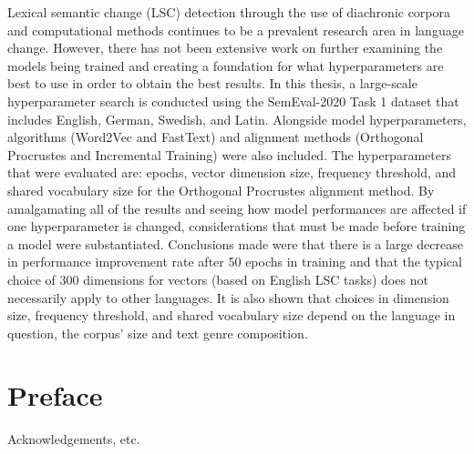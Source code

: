 \documentclass[11pt, a4paper]{article}
\begin{document}
Lexical semantic change (LSC) detection through the use of diachronic corpora and computational methods continues to be a prevalent research area in language change. However, there has not been extensive work on further examining the models being trained and creating a foundation for what hyperparameters are best to use in order to obtain the best results.  In this thesis,  a large-scale hyperparameter search is conducted using the SemEval-2020 Task 1 dataset that includes English, German, Swedish, and Latin. Alongside model hyperparameters, algorithms (Word2Vec and FastText) and alignment methods (Orthogonal Procrustes and Incremental Training) were also included. The hyperparameters that were evaluated are: epochs, vector dimension size, frequency threshold, and shared vocabulary size for the Orthogonal Procrustes alignment method. By amalgamating all of the results and seeing how model performances are affected if one hyperparameter is changed, considerations that must be made before training a model were substantiated. Conclusions made were that there is a large decrease in performance improvement rate after 50 epochs in training and that the typical choice of 300 dimensions for vectors (based on English LSC tasks) does not necessarily apply to other languages. It is also shown that choices in dimension size, frequency threshold, and shared vocabulary size depend on the language in question, the corpus' size and text genre composition. 

\thispagestyle{empty}

\newpage
\section*{Preface}

Acknowledgements, etc.

\thispagestyle{empty}

\newpage

\begingroup
\hypersetup{linkcolor=black} %
\begin{spacing}{0.0}
\tableofcontents
\end{spacing}
\endgroup

\thispagestyle{empty}
\end{document}
